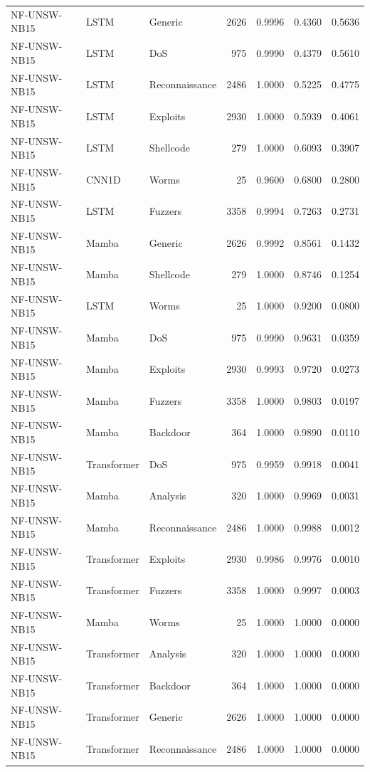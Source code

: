 \begin{table}[ht]
\begin{tabular}{lllrrrr}
NF-UNSW-NB15 & LSTM & Generic & 2626 & 0.9996 & 0.4360 & 0.5636 \\
NF-UNSW-NB15 & LSTM & DoS & 975 & 0.9990 & 0.4379 & 0.5610 \\
NF-UNSW-NB15 & LSTM & Reconnaissance & 2486 & 1.0000 & 0.5225 & 0.4775 \\
NF-UNSW-NB15 & LSTM & Exploits & 2930 & 1.0000 & 0.5939 & 0.4061 \\
NF-UNSW-NB15 & LSTM & Shellcode & 279 & 1.0000 & 0.6093 & 0.3907 \\
NF-UNSW-NB15 & CNN1D & Worms & 25 & 0.9600 & 0.6800 & 0.2800 \\
NF-UNSW-NB15 & LSTM & Fuzzers & 3358 & 0.9994 & 0.7263 & 0.2731 \\
NF-UNSW-NB15 & Mamba & Generic & 2626 & 0.9992 & 0.8561 & 0.1432 \\
NF-UNSW-NB15 & Mamba & Shellcode & 279 & 1.0000 & 0.8746 & 0.1254 \\
NF-UNSW-NB15 & LSTM & Worms & 25 & 1.0000 & 0.9200 & 0.0800 \\
NF-UNSW-NB15 & Mamba & DoS & 975 & 0.9990 & 0.9631 & 0.0359 \\
NF-UNSW-NB15 & Mamba & Exploits & 2930 & 0.9993 & 0.9720 & 0.0273 \\
NF-UNSW-NB15 & Mamba & Fuzzers & 3358 & 1.0000 & 0.9803 & 0.0197 \\
NF-UNSW-NB15 & Mamba & Backdoor & 364 & 1.0000 & 0.9890 & 0.0110 \\
NF-UNSW-NB15 & Transformer & DoS & 975 & 0.9959 & 0.9918 & 0.0041 \\
NF-UNSW-NB15 & Mamba & Analysis & 320 & 1.0000 & 0.9969 & 0.0031 \\
NF-UNSW-NB15 & Mamba & Reconnaissance & 2486 & 1.0000 & 0.9988 & 0.0012 \\
NF-UNSW-NB15 & Transformer & Exploits & 2930 & 0.9986 & 0.9976 & 0.0010 \\
NF-UNSW-NB15 & Transformer & Fuzzers & 3358 & 1.0000 & 0.9997 & 0.0003 \\
NF-UNSW-NB15 & Mamba & Worms & 25 & 1.0000 & 1.0000 & 0.0000 \\
NF-UNSW-NB15 & Transformer & Analysis & 320 & 1.0000 & 1.0000 & 0.0000 \\
NF-UNSW-NB15 & Transformer & Backdoor & 364 & 1.0000 & 1.0000 & 0.0000 \\
NF-UNSW-NB15 & Transformer & Generic & 2626 & 1.0000 & 1.0000 & 0.0000 \\
NF-UNSW-NB15 & Transformer & Reconnaissance & 2486 & 1.0000 & 1.0000 & 0.0000 \\

\end{tabular}
\end{table}
